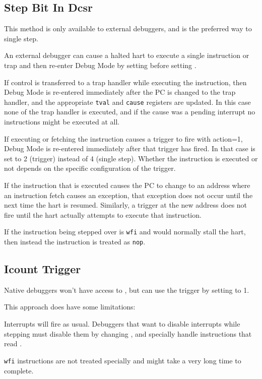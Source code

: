 \subsection{Step Bit In Dcsr} \label{stepBit}

This method is only available to external debuggers, and is the preferred way
to single step.

An external debugger can cause a halted hart to execute a single instruction or
trap
and then re-enter Debug Mode by setting \FcsrDcsrStep before setting
\FdmDmcontrolResumereq.

If control is transferred to a trap handler while executing the instruction,
then Debug Mode is re-entered immediately after the PC is changed to the trap
handler, and the appropriate {\tt tval} and {\tt cause} registers are updated.
In this case none of the trap handler is executed, and if the cause was a
pending interrupt no instructions might be executed at all.

If executing or fetching the instruction causes a trigger to fire with action=1, Debug Mode
is re-entered immediately after that trigger has fired. In that case \FcsrDcsrCause is
set to 2 (trigger) instead of 4 (single step).  Whether the instruction is
executed or not depends on the specific configuration of the trigger.

If the instruction that is executed causes the PC to change to an address where
an instruction fetch causes an exception, that exception does not occur until
the next time the hart is resumed. Similarly, a trigger at the new address does
not fire until the hart actually attempts to execute that instruction.

If the instruction being stepped over is {\tt wfi} and would normally stall the
hart, then instead the instruction is treated as {\tt nop}.

\subsection{Icount Trigger}

Native debuggers won't have access to \RcsrDcsr, but can use the \RcsrIcount
trigger by setting \FcsrIcountCount to 1.

\begin{steps}{This approach does have some limitations:}
    \item Interrupts will fire as usual. Debuggers that want to disable
        interrupts while stepping must disable them by changing \Rmstatus, and
        specially handle instructions that read \Rmstatus.
    \item {\tt wfi} instructions are not treated specially and might take a
        very long time to complete.
\end{steps}

